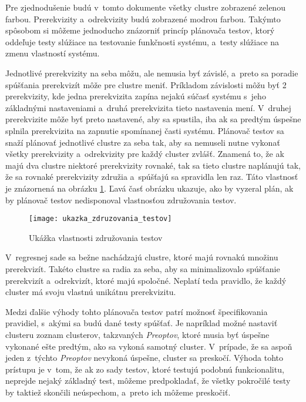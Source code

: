 Pre zjednodušenie budú v~tomto dokumente všetky clustre zobrazené 
zelenou farbou.
Prerekvizity a~odrekvizity budú zobrazené modrou farbou. Takýmto spôsobom
si môžeme jednoducho znázorniť princíp plánovača testov, ktorý oddeľuje testy
slúžiace na testovanie funkčnosti systému, a~testy slúžiace na zmenu 
vlastností systému.

Jednotlivé prerekvizity na seba môžu, ale nemusia byť závislé, a~preto 
sa poradie spúšťania prerekvizít môže pre clustre meniť.
Príkladom závislosti môžu byť 2 prerekvizity, kde jedna prerekvizita 
zapína nejakú súčasť systému s~jeho základnými nastaveniami 
a~druhá prerekvizita tieto nastavenia mení. 
V~druhej prerekvizite môže byť preto nastavené, aby sa spustila, iba ak 
sa predtým úspešne splnila prerekvizita na zapnutie spomínanej časti 
systému. Plánovač testov sa snaží plánovať jednotlivé clustre za seba 
tak, aby sa nemuseli nutne vykonať všetky prerekvizity a~odrekvizity pre 
každý cluster zvlášť. Znamená to, že ak majú dva clustre niektoré 
prerekvizity rovnaké, tak sa tieto clustre naplánujú tak, že sa rovnaké 
prerekvizity združia a~spúšťajú sa spravidla len raz. 
Táto vlastnosť je znázornená na obrázku 
\ref{obrazok:ukazka_zdruzovania_testov}. 
Ľavá časť obrázku ukazuje, ako by vyzeral plán, ak by plánovač testov
nedisponoval vlastnosťou združovania testov.

\begin{figure}[h]
  \begin{center}
    \texttt{[image: ukazka\_zdruzovania\_testov]}
    \caption{Ukážka vlastnosti združovania testov}
    \label{obrazok:ukazka_zdruzovania_testov}
  \end{center}
\end{figure}

V~regresnej sade sa bežne nachádzajú clustre, ktoré majú rovnakú množinu 
prerekvizít. Takéto clustre sa radia za seba, aby sa minimalizovalo
spúšťanie prerekvizít a~odrekvizít, ktoré majú spoločné. Neplatí teda 
pravidlo, že každý cluster má svoju vlastnú unikátnu prerekvizitu.

Medzi ďalšie výhody tohto plánovača testov patrí možnosť špecifikovania 
pravidiel, s~akými sa budú dané testy spúšťať. Je napríklad možné 
nastaviť clusteru zoznam clusterov, takzvaných \textit{Preoptov}, ktoré musia byť 
úspešne vykonané ešte predtým, ako sa vykoná samotný cluster. V~prípade, 
že sa aspoň jeden z~týchto \textit{Preoptov} nevykoná úspešne, cluster sa preskočí.
Výhoda tohto prístupu je v~tom, že ak zo sady testov, ktoré testujú 
podobnú funkcionalitu, neprejde nejaký základný test, môžeme predpokladať, 
že všetky pokročilé testy by taktiež skončili neúspechom, 
a~preto ich môžeme preskočiť.

